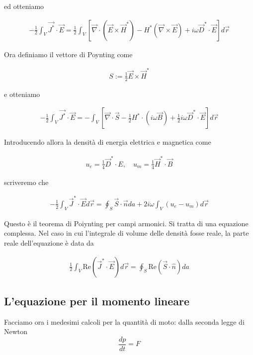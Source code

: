 \documentclass{report}
\begin{document}
ed otteniamo 

\begin{align}
     -\frac{1}{2}\int_V \vec{J^*}\cdot \vec{E} = \frac{1}{2}\int_V [\vec{\nabla}\cdot (\vec{E}\times \vec{H}^*) - H^*(\vec{\nabla}\times \vec{E}) + i\omega \vec{D}^*\cdot \vec{E}]d\vec{r}
\end{align}

Ora definiamo il vettore di Poynting come 

\begin{align}
    S := \frac{1}{2}\vec{E}\times \vec{H}^*
\end{align}

e otteniamo 

\begin{align}
    -\frac{1}{2}\int_V \vec{J^*}\cdot \vec{E} = -\int_V [\vec{\nabla}\cdot \vec{S} - \frac{1}{2}H^*\cdot (i\omega \vec{B}) + \frac{1}{2}i\omega \vec{D}^*\cdot \vec{E}]d\vec{r}
\end{align}

Introducendo allora la densità di energia elettrica e magnetica come 

\begin{align}
    u_e = \frac{1}{4}\vec{D}^*\cdot E, \quad u_m = \frac{1}{4}\vec{H}^*\cdot \vec{B}
\end{align}

scriveremo che 

\begin{align}
    -\frac{1}{2}\int_V \vec{J}^*\cdot \vec{E}d\vec{r} = \oint_S \vec{S}\cdot \vec{n}da + 2i\omega \int_V (u_e - u_m)d\vec{r}
\end{align}

Questo è il teorema di Poiynting per campi armonici. Si tratta di una equazione complessa. Nel caso in cui l'integrale di volume delle densità fosse reale, la parte reale dell'equazione è data da 

\begin{align}
    \frac{1}{2}\int_V \text{Re}(\vec{J}^* \cdot \vec{E})d\vec{r} = \oint_S \text{Re}(\vec{S}\cdot \hat{n})da
\end{align}

\subsection{L'equazione per il momento lineare}

Facciamo ora i medesimi calcoli per la quantità di moto: dalla seconda legge di Newton
\begin{equation}
    \frac{dp}{dt}  = F
\end{equation}
\end{document}
